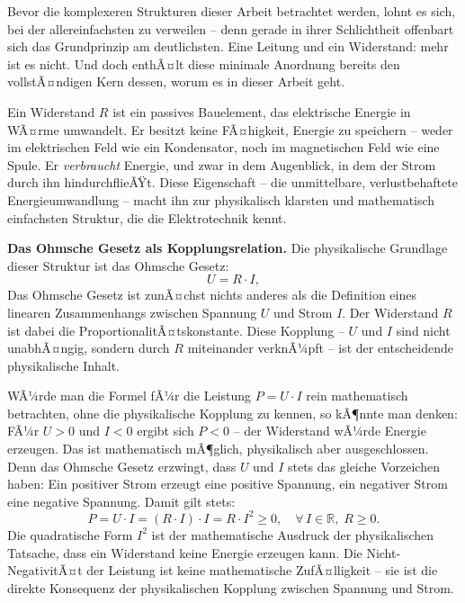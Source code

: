 ﻿\documentclass[12pt, a4paper]{article}
\begin{document}
	Bevor die komplexeren Strukturen dieser Arbeit betrachtet werden, lohnt es sich, bei der allereinfachsten zu verweilen -- denn gerade in ihrer Schlichtheit offenbart sich das Grundprinzip am deutlichsten. Eine Leitung und ein Widerstand: mehr ist es nicht. Und doch enthÃ¤lt diese minimale Anordnung bereits den vollstÃ¤ndigen Kern dessen, worum es in dieser Arbeit geht.

	Ein Widerstand $R$ ist ein passives Bauelement, das elektrische Energie in WÃ¤rme umwandelt. Er besitzt keine FÃ¤higkeit, Energie zu speichern -- weder im elektrischen Feld wie ein Kondensator, noch im magnetischen Feld wie eine Spule. Er \textit{verbraucht} Energie, und zwar in dem Augenblick, in dem der Strom durch ihn hindurchflieÃŸt. Diese Eigenschaft -- die unmittelbare, verlustbehaftete Energieumwandlung -- macht ihn zur physikalisch klarsten und mathematisch einfachsten Struktur, die die Elektrotechnik kennt.

	\textbf{Das Ohmsche Gesetz als Kopplungsrelation.}
	Die physikalische Grundlage dieser Struktur ist das Ohmsche Gesetz:
	\begin{equation}
		U = R \cdot I,
		\label{eq:ohm}
	\end{equation}
	Das Ohmsche Gesetz ist zunÃ¤chst nichts anderes als die Definition eines linearen Zusammenhangs zwischen Spannung $U$ und Strom $I$. Der Widerstand $R$ ist dabei die ProportionalitÃ¤tskonstante. Diese Kopplung -- $U$ und $I$ sind nicht unabhÃ¤ngig, sondern durch $R$ miteinander verknÃ¼pft -- ist der entscheidende physikalische Inhalt.

	WÃ¼rde man die Formel fÃ¼r die Leistung $P = U \cdot I$ rein mathematisch betrachten, ohne die physikalische Kopplung zu kennen, so kÃ¶nnte man denken: FÃ¼r $U > 0$ und $I < 0$ ergibt sich $P < 0$ -- der Widerstand wÃ¼rde Energie erzeugen. Das ist mathematisch mÃ¶glich, physikalisch aber ausgeschlossen. Denn das Ohmsche Gesetz erzwingt, dass $U$ und $I$ stets das gleiche Vorzeichen haben: Ein positiver Strom erzeugt eine positive Spannung, ein negativer Strom eine negative Spannung. Damit gilt stets:
	\begin{equation}
		P = U \cdot I = (R \cdot I) \cdot I = R \cdot I^2 \geq 0, \quad \forall\, I \in \mathbb{R},\; R \geq 0.
		\label{eq:leistung_widerstand_einl}
	\end{equation}
	Die quadratische Form $I^2$ ist der mathematische Ausdruck der physikalischen Tatsache, dass ein Widerstand keine Energie erzeugen kann. Die Nicht-NegativitÃ¤t der Leistung ist keine mathematische ZufÃ¤lligkeit -- sie ist die direkte Konsequenz der physikalischen Kopplung zwischen Spannung und Strom.
\end{document}
